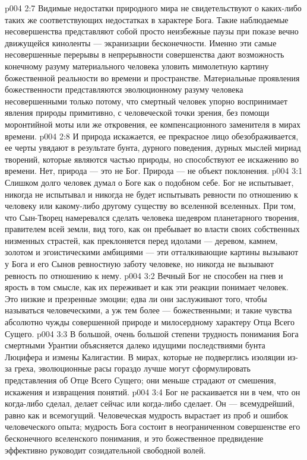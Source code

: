 \vs p004 2:7 Видимые недостатки природного мира не свидетельствуют о каких\hyp{}либо таких же соответствующих недостатках в характере Бога. Такие наблюдаемые несовершенства представляют собой просто неизбежные паузы при показе вечно движущейся киноленты --- экранизации бесконечности. Именно эти самые несовершенные перерывы в непрерывности совершенства дают возможность конечному разуму материального человека уловить мимолетную картину божественной реальности во времени и пространстве. Материальные проявления божественности представляются эволюционному разуму человека несовершенными только потому, что смертный человек упорно воспринимает явления природы примитивно, с человеческой точки зрения, без помощи моронтийной моты или же откровения, ее компенсационного заменителя в мирах времени.
\vs p004 2:8 И природа искажается, ее прекрасное лицо обезображивается, ее черты увядают в результате бунта, дурного поведения, дурных мыслей мириад творений, которые являются частью природы, но способствуют ее искажению во времени. Нет, природа --- это не Бог. Природа --- не объект поклонения.
\vs p004 3:1 Слишком долго человек думал о Боге как о подобном себе. Бог не испытывает, никогда не испытывал и никогда не будет испытывать ревности по отношению к человеку или какому\hyp{}либо другому существу во вселенной вселенных. При том, что Сын\hyp{}Творец намеревался сделать человека шедевром планетарного творения, правителем всей земли, вид того, как он пребывает во власти своих собственных низменных страстей, как преклоняется перед идолами --- деревом, камнем, золотом и эгоистическими амбициями --- эти отталкивающие картины вызывают у Бога и его Сынов ревностную заботу  человеке, но никогда не вызывают ревность по отношению к нему.
\vs p004 3:2 Вечный Бог не способен на гнев и ярость в том смысле, как их переживает и как эти реакции понимает человек. Это низкие и презренные эмоции; едва ли они заслуживают того, чтобы называться человеческими, а уж тем более --- божественными; и такие чувства абсолютно чужды совершенной природе и милосердному характеру Отца Всего Сущего.
\vs p004 3:3 \pc В большой, очень большой степени трудность понимания Бога смертными Урантии объясняется далеко идущими последствиями бунта Люцифера и измены Калигастии. В мирах, которые не подверглись изоляции из\hyp{}за греха, эволюционные расы гораздо лучше могут сформулировать представления об Отце Всего Сущего; они меньше страдают от смешения, искажения и извращения понятий.
\vs p004 3:4 \pc Бог не раскаивается ни в чем, что он когда\hyp{}либо сделал, делает сейчас или когда\hyp{}либо сделает. Он --- всемудрейший, равно как и всемогущий. Человеческая мудрость вырастает из проб и ошибок человеческого опыта; мудрость Бога состоит в неограниченном совершенстве его бесконечного вселенского понимания, и это божественное предвидение эффективно руководит созидательной свободной волей.
